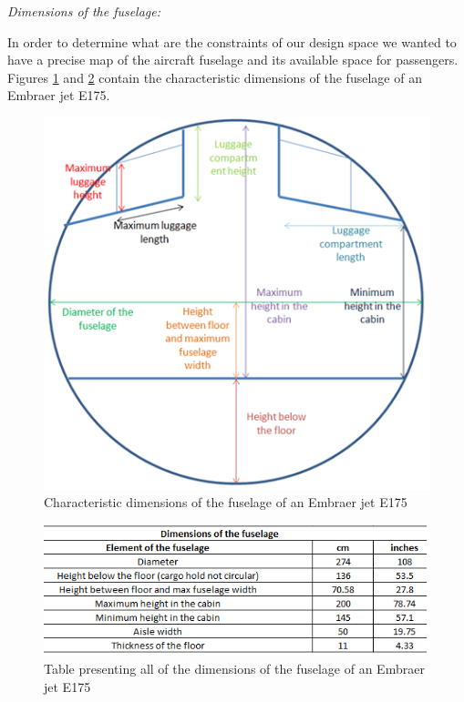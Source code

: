 \noindent\emph{Dimensions of the fuselage:}

In order to determine what are the constraints of our design space we wanted to have a precise map of the aircraft fuselage and its available space for passengers. Figures \ref{fig: fuselage_dimensions} and \ref{fig:fuselage_table} contain the characteristic dimensions of the fuselage of an Embraer jet E175.\\

\begin{figure}[h]
\centering
\includegraphics[width=12cm]{images/fuselage_dimensions}
\caption{Characteristic dimensions of the fuselage of an Embraer jet E175}
\label{fig: fuselage_dimensions}
\end{figure}

\begin{figure}[h]
\centering
\includegraphics[width=12cm]{images/fuselage_table}
\caption{Table presenting all of the dimensions of the fuselage of an Embraer jet E175}
\label{fig:fuselage_table}
\end{figure}

